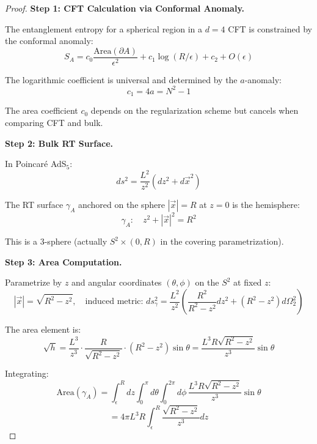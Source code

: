 \documentclass[12pt,a4paper]{article}
\begin{document}
\begin{proof}
\textbf{Step 1: CFT Calculation via Conformal Anomaly.}

The entanglement entropy for a spherical region in a $d=4$ CFT is constrained by the conformal anomaly:
\begin{equation}
S_A = c_0 \frac{\text{Area}(\partial A)}{\epsilon^2} + c_1 \log(R/\epsilon) + c_2 + O(\epsilon)
\end{equation}

The logarithmic coefficient is universal and determined by the $a$-anomaly:
\begin{equation}
c_1 = 4a = N^2 - 1
\end{equation}

The area coefficient $c_0$ depends on the regularization scheme but cancels when comparing CFT and bulk.

\textbf{Step 2: Bulk RT Surface.}

In Poincaré AdS$_5$:
\begin{equation}
ds^2 = \frac{L^2}{z^2}(dz^2 + d\vec{x}^2)
\end{equation}

The RT surface $\gamma_A$ anchored on the sphere $|\vec{x}| = R$ at $z = 0$ is the hemisphere:
\begin{equation}
\gamma_A: \quad z^2 + |\vec{x}|^2 = R^2
\end{equation}

This is a $3$-sphere (actually $S^2 \times (0, R)$ in the covering parametrization).

\textbf{Step 3: Area Computation.}

Parametrize by $z$ and angular coordinates $(\theta, \phi)$ on the $S^2$ at fixed $z$:
\begin{equation}
|\vec{x}| = \sqrt{R^2 - z^2}, \quad \text{induced metric: } ds^2_{\gamma} = \frac{L^2}{z^2}\left( \frac{R^2}{R^2-z^2}dz^2 + (R^2-z^2)d\Omega_2^2 \right)
\end{equation}

The area element is:
\begin{equation}
\sqrt{h} = \frac{L^3}{z^3} \cdot \frac{R}{\sqrt{R^2-z^2}} \cdot (R^2-z^2) \sin\theta = \frac{L^3 R \sqrt{R^2-z^2}}{z^3}\sin\theta
\end{equation}

Integrating:
\begin{equation}
\text{Area}(\gamma_A) = \int_\epsilon^R dz \int_0^\pi d\theta \int_0^{2\pi} d\phi \, \frac{L^3 R \sqrt{R^2-z^2}}{z^3}\sin\theta
\end{equation}
\begin{equation}
= 4\pi L^3 R \int_\epsilon^R \frac{\sqrt{R^2-z^2}}{z^3} dz
\end{equation}


\end{proof}
\end{document}
